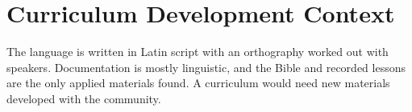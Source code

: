 \documentclass[12pt]{article}
\begin{document}
\section{Curriculum Development Context}
The language is written in Latin script with an orthography worked out with speakers. Documentation is mostly linguistic, and the Bible and recorded lessons are the only applied materials found. A curriculum would need new materials developed with the community.
\end{document}
